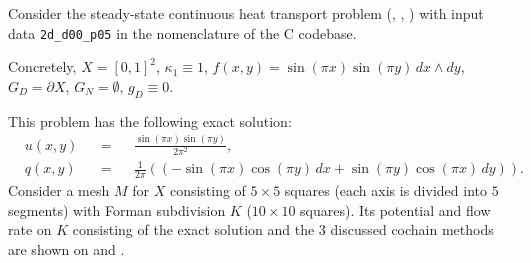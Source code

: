 \begin{example}
  \label{idec/diffusion/continuous/steady_state/examples/2d_d00_p05-example}
  Consider the steady-state continuous heat transport problem
  (,
   ,
   )
  with input data \verb|2d_d00_p05| in the nomenclature of the C codebase.

  Concretely,
    $X = [0, 1]^2$,
    $\kappa_1 \equiv 1$,
    $f(x, y) = \sin(\pi x) \sin(\pi y) \, d x \wedge d y$,
    $G_D = \partial X$,
    $G_N = \emptyset$,
    $g_D \equiv 0$.

  This problem has the following exact solution:
  \begin{subequations}
    \begin{alignat}{3}
      & u(x, y) && = && \frac{\sin(\pi x) \sin(\pi y)}{2 \pi^2}, \\
      & q(x, y) && = &&
        \frac{1}{2 \pi}
        ((- \sin(\pi x) \cos(\pi y) \, d x + \sin(\pi y) \cos(\pi x)\, d y)).
    \end{alignat}
  \end{subequations}
  Consider a mesh $M$ for $X$ consisting of $5 \times 5$ squares (each axis is
  divided into $5$ segments) with Forman subdivision $K$
  ($10 \times 10$ squares).
  Its potential and flow rate on $K$ consisting of the exact solution and the
  $3$ discussed cochain methods are shown on
  and
  .
\end{example}
